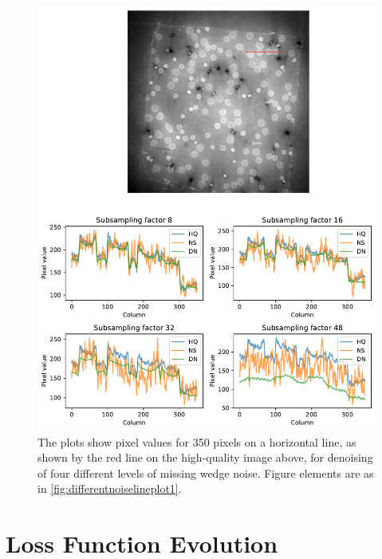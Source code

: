 \begin{figure}[htbp]
  \centering
  \includegraphics[width=.95\textwidth]{figures/differentnoiselineplot2.pdf}
  \caption[Line plot of denoising of different levels of noise]{The plots show pixel values for 350 pixels on a horizontal line, as shown by the red line on the high-quality image above, for denoising of four different levels of missing wedge noise. Figure elements are as in \cref{fig:differentnoiselineplot1}. }
  \label{fig:differentnoiselineplot2}
\end{figure}

\section{Loss Function Evolution}

